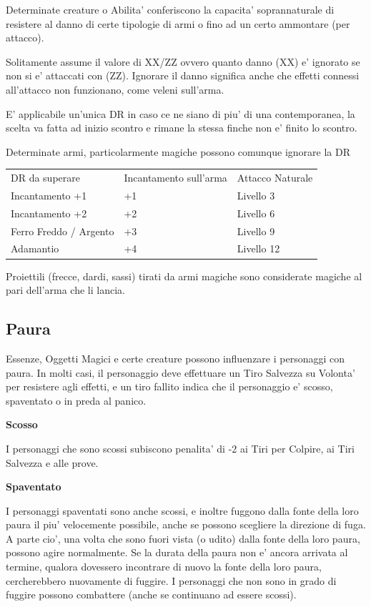\documentclass[a4paper,11pt,twoside,openany]{dndbook}
\begin{document}
{Determinate creature o Abilita' conferiscono la capacita' soprannaturale di resistere al danno di certe tipologie di armi o fino ad un certo ammontare (per attacco).

Solitamente assume il valore di XX/ZZ ovvero quanto danno (XX) e' ignorato se non si e' attaccati con (ZZ). Ignorare il danno significa anche che effetti connessi all'attacco non funzionano, come veleni sull'arma.

E' applicabile un'unica DR in caso ce ne siano di piu' di una contemporanea, la scelta va fatta ad inizio scontro e rimane la stessa finche non e' finito lo scontro.

Determinate armi, particolarmente magiche possono comunque ignorare la DR 

\bigskip

\begin{tabular}[c]{@{}lll@{}}
\toprule 
DR da superare & Incantamento sull'arma & Attacco Naturale\tabularnewline
Incantamento +1 & +1 & Livello 3\tabularnewline
Incantamento +2 & +2 & Livello 6\tabularnewline
Ferro Freddo / Argento & +3 & Livello 9\tabularnewline
Adamantio & +4 & Livello 12\tabularnewline
\bottomrule
\end{tabular}

Proiettili (frecce, dardi, sassi) tirati da armi magiche sono considerate
magiche al pari dell'arma che li lancia.



\subsection{Paura}

\label{paura}

Essenze, Oggetti Magici e certe creature possono influenzare i personaggi con paura. In molti casi, il personaggio deve effettuare un Tiro Salvezza su Volonta' per resistere agli effetti, e un tiro fallito indica che il personaggio e' scosso, spaventato o in preda al panico.

\textbf{Scosso}

I personaggi che sono scossi subiscono penalita' di -2 ai Tiri per Colpire, ai Tiri Salvezza e alle prove.

\textbf{Spaventato}

I personaggi spaventati sono anche scossi, e inoltre fuggono dalla fonte della loro paura il piu' velocemente possibile, anche se possono scegliere la direzione di fuga. A parte cio', una volta che sono fuori vista (o udito) dalla fonte della loro paura, possono agire normalmente. Se la durata della paura non e' ancora arrivata al termine, qualora dovessero incontrare di nuovo la fonte della loro paura, cercherebbero nuovamente di fuggire. I personaggi che non sono in grado di fuggire possono combattere (anche se continuano ad essere scossi).

}
\end{document}
